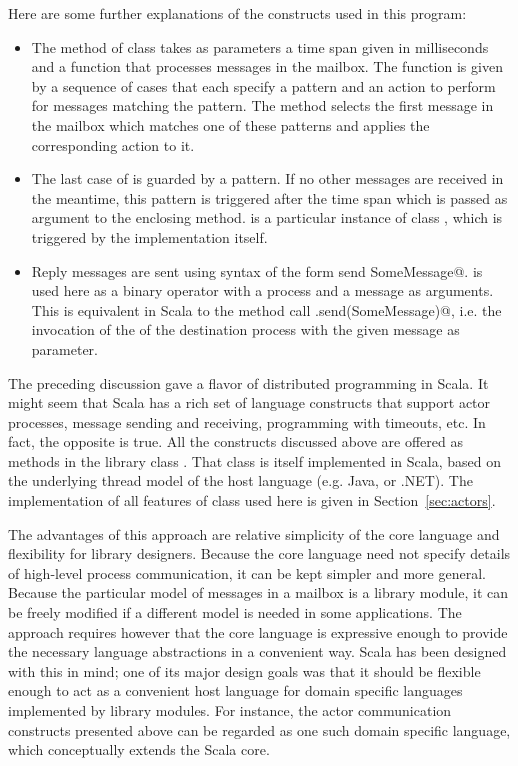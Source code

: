 \documentclass[11pt]{book}
\begin{document}
Here are some further explanations of the constructs used in this
program:
\begin{itemize}
\item
The \verb@receiveWithin@ method of class \verb@Actor@ takes as
parameters a time span given in milliseconds and a function that
processes messages in the mailbox. The function is given by a sequence
of cases that each specify a pattern and an action to perform for
messages matching the pattern. The \verb@receiveWithin@ method selects
the first message in the mailbox which matches one of these patterns
and applies the corresponding action to it.
\item
The last case of \verb@receiveWithin@ is guarded by a
\verb@TIMEOUT@ pattern. If no other messages are received in the meantime, this
pattern is triggered after the time span which is passed as argument
to the enclosing \verb@receiveWithin@ method. \verb@TIMEOUT@ is a
particular instance of class \verb@Message@, which is triggered by the
\verb@Actor@ implementation itself.
\item
Reply messages are sent using syntax of the form
\verb@destination send SomeMessage@. \verb@send@ is used here as a
binary operator with a process and a message as arguments. This is
equivalent in Scala to the method call
\verb@destination.send(SomeMessage)@, i.e. the invocation of
the \verb@send@ of the destination process with the given message as
parameter.
\end{itemize}
The preceding discussion gave a flavor of distributed programming in
Scala. It might seem that Scala has a rich set of language constructs
that support actor processes, message sending and receiving,
programming with timeouts, etc. In fact, the opposite is true. All the
constructs discussed above are offered as methods in the library class
\verb@Actor@. That class is itself implemented in Scala, based on the underlying 
thread model of the host language (e.g. Java, or .NET).
The implementation of all features of class \verb@Actor@ used here is
given in Section~\ref{sec:actors}.

The advantages of this approach are relative simplicity of the core
language and flexibility for library designers. Because the core
language need not specify details of high-level process communication,
it can be kept simpler and more general. Because the particular model
of messages in a mailbox is a library module, it can be freely
modified if a different model is needed in some applications.  The
approach requires however that the core language is expressive enough
to provide the necessary language abstractions in a convenient
way. Scala has been designed with this in mind; one of its major
design goals was that it should be flexible enough to act as a
convenient host language for domain specific languages implemented by
library modules. For instance, the actor communication constructs
presented above can be regarded as one such domain specific language,
which conceptually extends the Scala core.
\end{document}
